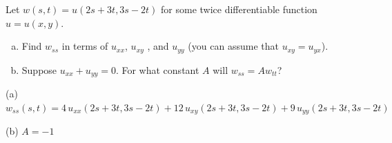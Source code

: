 \begin{question}[M200 2015D] %
Let $w(s,t) = u(2s + 3t, 3s - 2t)$ for some twice differentiable function 
$u = u(x, y)$.
\begin{enumerate}[(a)]
\item
Find $w_{ss}$ in terms of $u_{xx}$, $u_{xy}$ , and $u_{yy}$ 
(you can assume that $u_{xy} = u_{yx}$).
\item
Suppose $u_{xx} + u_{yy} = 0$. For what constant $A$ will 
$w_{ss} = Aw_{tt}$?
\end{enumerate}
\end{question}

%

\begin{answer}
(a) $w_{ss}(s,t) =4\,u_{xx}(2s + 3t, 3s - 2t) 
                 +12\,u_{xy}(2s + 3t, 3s - 2t) 
                   +9\,u_{yy}(2s + 3t, 3s - 2t) $

(b) $A=-1$
\end{answer}

